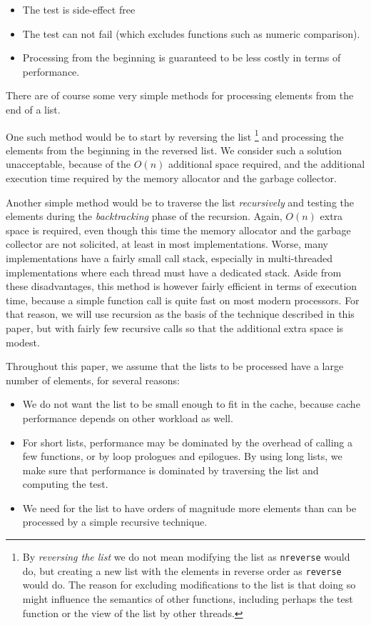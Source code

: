 \begin{itemize}
\item The test is side-effect free
\item The test can not fail (which excludes functions such as numeric
  comparison).
\item Processing from the beginning is guaranteed to be less costly in
  terms of performance.
\end{itemize}

There are of course some very simple methods for processing elements
from the end of a list.

One such method would be to start by reversing the list%
\footnote{By \emph{reversing the list} we do not mean modifying the
  list as \texttt{nreverse} would do, but creating a new list with the
  elements in reverse order as \texttt{reverse} would do.  The reason
  for excluding modifications to the list is that doing so might
  influence the semantics of other functions, including perhaps the
  test function or the view of the list by other threads.}
and processing the elements from the beginning in the reversed list.
We consider such a solution unacceptable, because of the $O(n)$
additional space required, and the additional execution time required
by the memory allocator and the garbage collector.

Another simple method would be to traverse the list \emph{recursively}
and testing the elements during the \emph{backtracking} phase of the
recursion.  Again, $O(n)$ extra space is required, even though this
time the memory allocator and the garbage collector are not solicited,
at least in most implementations.  Worse, many implementations have a
fairly small call stack, especially in multi-threaded implementations
where each thread must have a dedicated stack.  Aside from these
disadvantages, this method is however fairly efficient in terms of
execution time, because a simple function call is quite fast on most
modern processors.  For that reason, we will use recursion as the
basis of the technique described in this paper, but with fairly few
recursive calls so that the additional extra space is modest.

Throughout this paper, we assume that the lists to be processed have a
large number of elements, for several reasons:

\begin{itemize}
\item We do not want the list to be small enough to fit in the cache,
  because cache performance depends on other workload as well.
\item For short lists, performance may be dominated by the overhead of
  calling a few functions, or by loop prologues and epilogues.  By
  using long lists, we make sure that performance is dominated by
  traversing the list and computing the test.
\item We need for the list to have orders of magnitude more elements
  than can be processed by a simple recursive technique.
\end{itemize}

